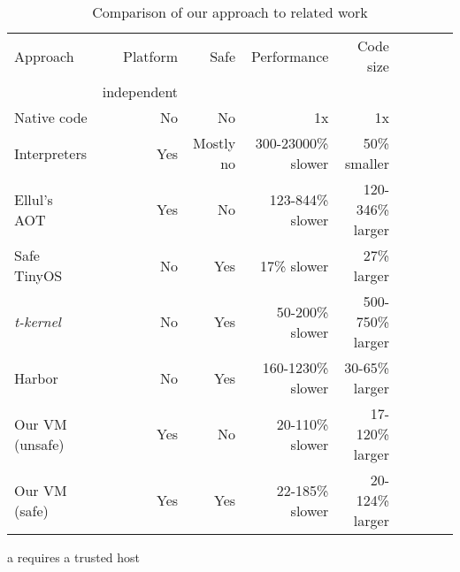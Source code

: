 \begin{table*}[]
\centering
\caption{Comparison of our approach to related work}
\label{tbl-contribution-comparison}
\begin{threeparttable}
\begin{tabular}{lrrrrrrrr}
\toprule
Approach        & Platform    & Safe               & Performance        & Code size               \\
                & independent &                    &                    & \\
\midrule
Native code     & No          & No                 & 1x                 & 1x                      \\
Interpreters    & Yes         & Mostly no          & 300-23000\% slower & ~50\% smaller           \\
Ellul's AOT     & Yes         & No                 & 123-844\% slower   & 120-346\% larger        \\
Safe TinyOS     & No          & Yes\tnote{a}       & 17\% slower        & 27\% larger             \\
\emph{t-kernel} & No          & Yes                & 50-200\% slower    & 500-750\% larger        \\
Harbor          & No          & Yes                & 160-1230\% slower  & 30-65\% larger          \\
Our VM (unsafe) & Yes         & No                 & 20-110\% slower    & 17-120\% larger         \\
Our VM (safe)   & Yes         & Yes                & 22-185\% slower    & 20-124\% larger         \\
\bottomrule
\end{tabular}
\begin{tablenotes}
	\item[a] requires a trusted host
\end{tablenotes}
\end{threeparttable}
\end{table*}
